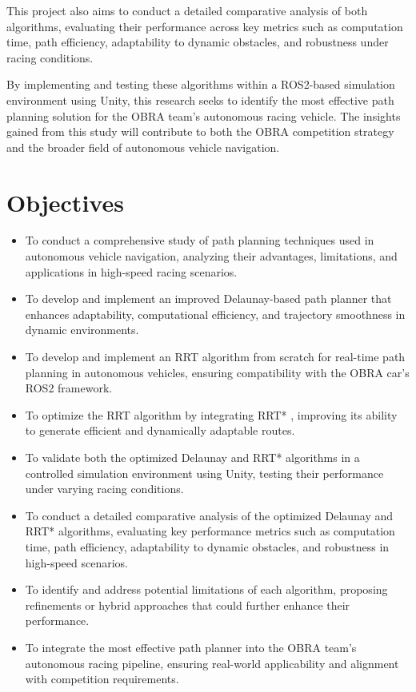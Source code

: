 \documentclass[a4paper,11pt]{report}
\begin{document}
This project also aims to conduct a detailed comparative analysis of both algorithms, evaluating their performance across key metrics such as computation time, path efficiency, adaptability to dynamic obstacles, and robustness under racing conditions. 

By implementing and testing these algorithms within a ROS2-based simulation environment using Unity, this research seeks to identify the most effective path planning solution for the OBRA team's autonomous racing vehicle. The insights gained from this study will contribute to both the OBRA competition strategy and the broader field of autonomous vehicle navigation.


\section{Objectives}
\begin{itemize}
    \item To conduct a comprehensive study of path planning techniques used in autonomous vehicle navigation, analyzing their advantages, limitations, and applications in high-speed racing scenarios. \cite{reference3}
    \item To develop and implement an improved Delaunay-based path planner that enhances adaptability, computational efficiency, and trajectory smoothness in dynamic environments.
    \item To develop and implement an RRT algorithm from scratch for real-time path planning in autonomous vehicles, ensuring compatibility with the OBRA car's ROS2 framework.
    \item To optimize the RRT algorithm by integrating RRT* \cite{reference4}, improving its ability to generate efficient and dynamically adaptable routes.
    \item To validate both the optimized Delaunay and RRT* algorithms in a controlled simulation environment using Unity, testing their performance under varying racing conditions.
    \item To conduct a detailed comparative analysis of the optimized Delaunay and RRT* algorithms, evaluating key performance metrics such as computation time, path efficiency, adaptability to dynamic obstacles, and robustness in high-speed scenarios.
    \item To identify and address potential limitations of each algorithm, proposing refinements or hybrid approaches that could further enhance their performance.
    \item To integrate the most effective path planner into the OBRA team's autonomous racing pipeline, ensuring real-world applicability and alignment with competition requirements.
\end{itemize}
\end{document}
